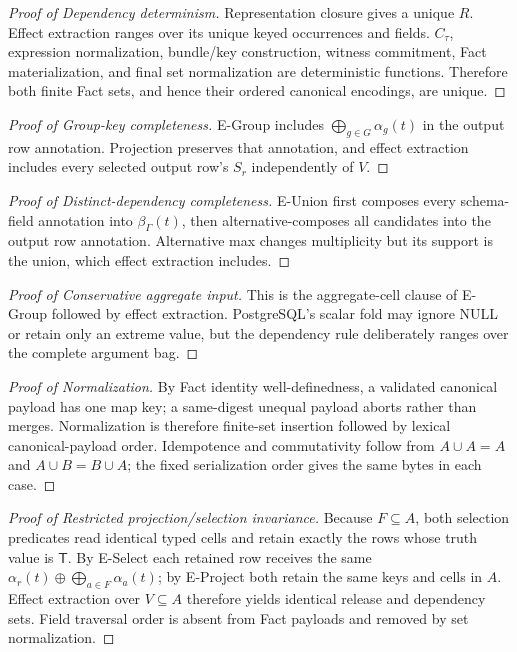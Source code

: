 \documentclass[journal,onecolumn]{IEEEtran}
\begin{document}
\begin{proof}[Proof of Dependency determinism]
Representation closure gives a unique $R$. Effect extraction ranges over its
unique keyed occurrences and fields. $C_\tau$, expression normalization,
bundle/key construction, witness commitment, Fact materialization, and final
set normalization are deterministic functions. Therefore both finite Fact
sets, and hence their ordered canonical encodings, are unique.
\end{proof}

\begin{proof}[Proof of Group-key completeness]
E-Group includes $\bigoplus_{g\in G}\alpha_g(t)$ in the output row annotation.
Projection preserves that annotation, and effect extraction includes every
selected output row's $S_r$ independently of $V$.
\end{proof}

\begin{proof}[Proof of Distinct-dependency completeness]
E-Union first composes every schema-field annotation into $\beta_\Gamma(t)$,
then alternative-composes all candidates into the output row annotation.
Alternative max changes multiplicity but its support is the union, which
effect extraction includes.
\end{proof}

\begin{proof}[Proof of Conservative aggregate input]
This is the aggregate-cell clause of E-Group followed by effect extraction.
PostgreSQL's scalar fold may ignore NULL or retain only an extreme value, but
the dependency rule deliberately ranges over the complete argument bag.
\end{proof}

\begin{proof}[Proof of Normalization]
By Fact identity well-definedness, a validated canonical payload has one map
key; a same-digest unequal payload aborts rather than merges. Normalization is
therefore finite-set insertion followed by lexical canonical-payload order.
Idempotence and commutativity follow from $A\cup A=A$ and $A\cup B=B\cup A$;
the fixed serialization order gives the same bytes in each case.
\end{proof}

\begin{proof}[Proof of Restricted projection/selection invariance]
Because $F\subseteq A$, both selection predicates read identical typed cells
and retain exactly the rows whose truth value is $\mathsf T$. By E-Select each
retained row receives the same
$\alpha_r(t)\oplus\bigoplus_{a\in F}\alpha_a(t)$; by E-Project both retain the
same keys and cells in $A$. Effect extraction over $V\subseteq A$ therefore
yields identical release and dependency sets. Field traversal order is absent
from Fact payloads and removed by set normalization.
\end{proof}
\end{document}
